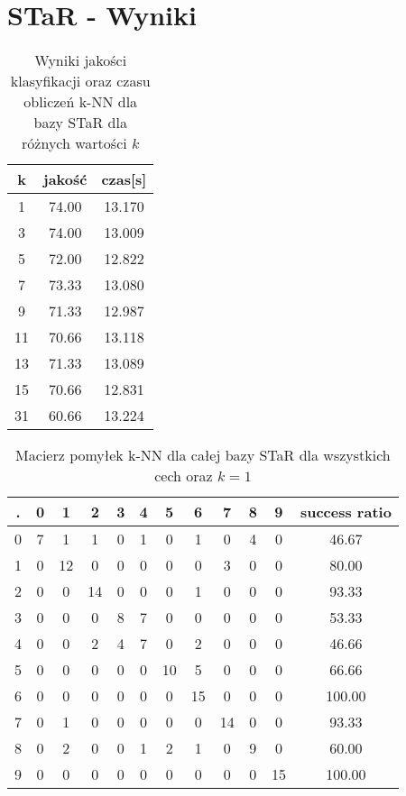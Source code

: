 \documentclass{classrepshort}
\begin{document}
\newpage

\section{STaR - Wyniki}

\begin{table}[h!]
  \centering
  \caption{Wyniki jakości klasyfikacji oraz czasu obliczeń k-NN dla bazy STaR dla różnych wartości $k$}
  \label{tab:tab1}
  \begin{tabular}{|c|c|c|}
    \hline
	k & jakość & czas[s]\\
    \hline
	1 & 74.00 & 13.170\\
    \hline
	3 & 74.00 & 13.009\\
	\hline
	5 & 72.00 & 12.822\\
	\hline
	7 & 73.33 & 13.080\\
	\hline
	9 & 71.33 & 12.987\\
	\hline
	11 & 70.66 & 13.118\\
	\hline
	13 & 71.33 & 13.089\\
	\hline
	15 & 70.66 & 12.831\\
	\hline
	31 & 60.66 & 13.224\\
	\hline
  \end{tabular}
\end{table}

\begin{table}[h!]
  \centering
  \caption{Macierz pomyłek k-NN dla całej bazy STaR dla wszystkich cech oraz $k=1$}
  \label{tab:tab1}
  \begin{tabular}{|c|c|c|c|c|c|c|c|c|c|c|c|}
    \hline
	. & 0 & 1 & 2 & 3 & 4 & 5 & 6 & 7 & 8 & 9 & success ratio \\
    \hline
	0 & 7 & 1 & 1 & 0 & 1 & 0 & 1 & 0 & 4 & 0 & 46.67\\
    \hline
	1 & 0 & 12 & 0 & 0 & 0 & 0 & 0 & 3 & 0 & 0 & 80.00\\
	\hline
	2 & 0 & 0 & 14 & 0 & 0 & 0 & 1 & 0 & 0 & 0 & 93.33\\
	\hline
	3 & 0 & 0 & 0 & 8 & 7 & 0 & 0 & 0 & 0 & 0 & 53.33\\
	\hline
	4 & 0 & 0 & 2 & 4 & 7 & 0 & 2 & 0 & 0 & 0 & 46.66\\
	\hline
	5 & 0 & 0 & 0 & 0 & 0 & 10 & 5 & 0 & 0 & 0 & 66.66\\
	\hline
	6 & 0 & 0 & 0 & 0 & 0 & 0 & 15 & 0 & 0 & 0 & 100.00\\
	\hline
	7 & 0 & 1 & 0 & 0 & 0 & 0 & 0 & 14 & 0 & 0 & 93.33\\
	\hline
	8 & 0 & 2 & 0 & 0 & 1 & 2 & 1 & 0 & 9 & 0 & 60.00\\
	\hline
	9 & 0 & 0 & 0 & 0 & 0 & 0 & 0 & 0 & 0 & 15 & 100.00\\    
    \hline
  \end{tabular}
\end{table} 
\end{document}
